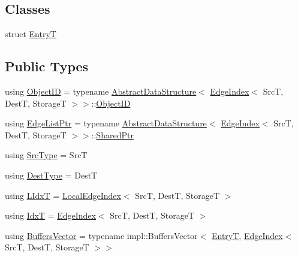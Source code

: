 \subsection*{Classes}
\begin{DoxyCompactItemize}
\item 
struct \hyperlink{structshad_1_1EdgeIndex_1_1EntryT}{Entry\-T}
\end{DoxyCompactItemize}
\subsection*{Public Types}
\begin{DoxyCompactItemize}
\item 
using \hyperlink{classshad_1_1EdgeIndex_ac1849d1d8dc7f32e2ca56fa224308ef2}{Object\-I\-D} = typename \hyperlink{classshad_1_1AbstractDataStructure}{Abstract\-Data\-Structure}$<$ \hyperlink{classshad_1_1EdgeIndex}{Edge\-Index}$<$ Src\-T, Dest\-T, Storage\-T $>$$>$\-::\hyperlink{classshad_1_1EdgeIndex_ac1849d1d8dc7f32e2ca56fa224308ef2}{Object\-I\-D}
\item 
using \hyperlink{classshad_1_1EdgeIndex_ae6b70863258ef3efebc3868e5c791a0d}{Edge\-List\-Ptr} = typename \hyperlink{classshad_1_1AbstractDataStructure}{Abstract\-Data\-Structure}$<$ \hyperlink{classshad_1_1EdgeIndex}{Edge\-Index}$<$ Src\-T, Dest\-T, Storage\-T $>$$>$\-::\hyperlink{classshad_1_1AbstractDataStructure_a8bb29450966955c546d40421ce46316f}{Shared\-Ptr}
\item 
using \hyperlink{classshad_1_1EdgeIndex_a10fd1a7498be01373f022c3e4445bd92}{Src\-Type} = Src\-T
\item 
using \hyperlink{classshad_1_1EdgeIndex_a1fe85e04eb8fbc43233e1656e93ca4fd}{Dest\-Type} = Dest\-T
\item 
using \hyperlink{classshad_1_1EdgeIndex_af0fe2f8cb6950ca82e97085c0baedf90}{L\-Idx\-T} = \hyperlink{classshad_1_1LocalEdgeIndex}{Local\-Edge\-Index}$<$ Src\-T, Dest\-T, Storage\-T $>$
\item 
using \hyperlink{classshad_1_1EdgeIndex_a8beb31c05450d63d7add3f9408c9943a}{Idx\-T} = \hyperlink{classshad_1_1EdgeIndex}{Edge\-Index}$<$ Src\-T, Dest\-T, Storage\-T $>$
\item 
using \hyperlink{classshad_1_1EdgeIndex_af749b171d243a86058fffe96247d42f5}{Buffers\-Vector} = typename impl\-::\-Buffers\-Vector$<$ \hyperlink{structshad_1_1EdgeIndex_1_1EntryT}{Entry\-T}, \hyperlink{classshad_1_1EdgeIndex}{Edge\-Index}$<$ Src\-T, Dest\-T, Storage\-T $>$$>$
\end{DoxyCompactItemize}
